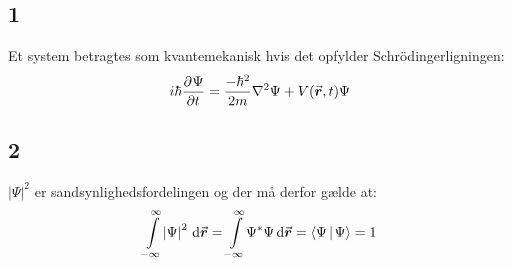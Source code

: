 \documentclass[../Kvantemekanik.tex]{subfiles}
\begin{document}
\subsection*{1}
Et system betragtes som kvantemekanisk hvis det opfylder Schrödingerligningen:
\begin{equation}
    i\hbar\frac{\partial^{}{\Psi}}{\partial {t}^{}}=\frac{-\hbar^{2}}{2m}\nabla^{2}\Psi+V({\vec{\boldsymbol{r}}},t)\Psi
\label{kvant:eq:sch}
\end{equation}
\subsection*{2}
$|\Psi|^2$ er sandsynlighedsfordelingen og der må derfor gælde at:
\begin{equation}
    \integral{\abs{\Psi}^{2}}{\v r}{-\infty}{\infty}=\integral{\Psi^{*}\Psi}{\v r}{-\infty}{\infty}=\braket{\Psi}{\Psi}=1
    \label{kvant:eq:norm}
\end{equation}
\end{document}

